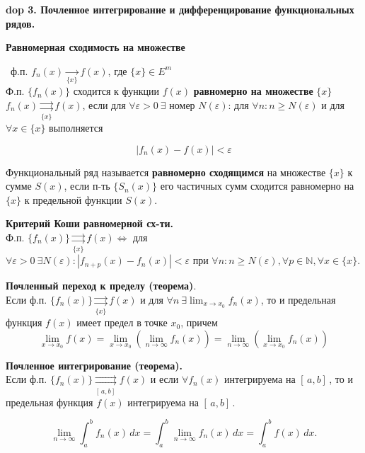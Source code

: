 \textbf{\LARGE dop 3. Почленное интегрирование и дифференцирование функциональных рядов.}

\textbf{Равномерная сходимость на множестве}

\mathLet \ ф.п. $f_n(x) \xrightarrow[\{x\}]{}  f(x)$, где $\{x\} \in E^m$ \\
Ф.п. $\{f_n(x)\}$ сходится к функции $f(x)$ \textbf{равномерно на множестве} $\{x\}$ \ $f_n(x)\underset{\{x\}}{\rightrightarrows}f(x)$, если для $\forall \varepsilon > 0 \ \exists$ номер $N(\varepsilon)$: для $\forall n: n \ge N(\varepsilon)$ и для $\forall x \in \{x\}$ выполняется

\begin{equation}
    |f_n(x) - f(x)| < \varepsilon
\end{equation}

\bigbreak
Функциональный ряд называется \textbf{равномерно сходящимся} на множестве $\{x\}$ к сумме $S(x)$, если п-ть $\{S_n(x)\}$ его частичных сумм сходится равномерно на $\{x\}$ к предельной функции $S(x)$.

\bigbreak
\textbf{Критерий Коши равномерной сх-ти.} \\
Ф.п. $\{f_n(x)\}\underset{\{x\}}{\rightrightarrows}f(x) \Leftrightarrow $ для $\forall \varepsilon > 0 \ \exists N(\varepsilon): |f_{n+p}(x) - f_n(x)| < \varepsilon \text{ при } \forall n: n \ge N(\varepsilon), \forall p \in \mathbb{N}, \forall x \in \{x\}$.

\bigbreak
\textbf{Почленный переход к пределу (теорема)}. \\
Если ф.п. $\{f_n(x)\} \underset{\{x\}}{\rightrightarrows}f(x)$ и для $\forall n \ \exists \lim_{x \rightarrow x_0}{f_n(x)} $, то и предельная функция $f(x)$ имеет предел в точке $x_0$, причем
\begin{equation}
    \lim_{x \rightarrow x_0}{f(x)} = \lim_{x \rightarrow x_0}{(\lim_{n \rightarrow \infty}{f_n(x)})} = \lim_{n \rightarrow \infty}{(\lim_{x \rightarrow x_0}{f_n(x)})}
\end{equation}

\bigbreak
\textbf{Почленное интегрирование (теорема).} \\
Если ф.п. $\{f_n(x)\} \underset{[\,a,b]\, }{\rightrightarrows}f(x)$ и если $\forall f_n(x)$ интегрируема на $[\,a,b]\,$, то и предельная функция $f(x)$ интегрируема на $[\,a,b]\,$.

\begin{equation}
    \lim_{n \rightarrow \infty}{\int_{a}^{b} f_n(x) \,dx} =  \int_{a}^{b} \lim_{n \rightarrow \infty}{f_n(x)} \,dx = \int_{a}^{b} f(x) \,dx.
\end{equation}

